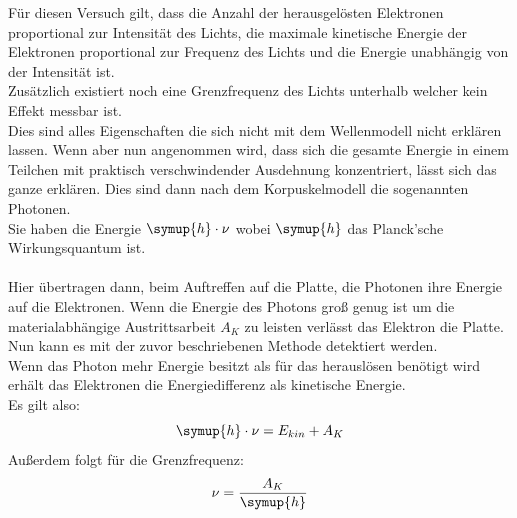     \noindent Für diesen Versuch gilt, dass die Anzahl der herausgelösten Elektronen proportional zur Intensität des Lichts, 
    die maximale kinetische Energie der Elektronen proportional zur Frequenz des Lichts und die Energie unabhängig von der Intensität ist.\\
    Zusätzlich existiert noch eine Grenzfrequenz des Lichts unterhalb welcher kein Effekt messbar ist.\\
    Dies sind alles Eigenschaften die sich nicht mit dem Wellenmodell nicht erklären lassen. Wenn aber nun angenommen wird, 
    dass sich die gesamte Energie in einem Teilchen mit praktisch verschwindender Ausdehnung konzentriert, lässt sich das ganze erklären.
    Dies sind dann nach dem Korpuskelmodell die sogenannten Photonen.\\
    Sie haben die Energie $\symup{h}\cdot \nu$ wobei $\symup{h}$ das Planck'sche Wirkungsquantum\cite{Planck} ist.\\\\
    \noindent Hier übertragen dann, beim Auftreffen auf die Platte, die Photonen ihre Energie auf die Elektronen.
    Wenn die Energie des Photons groß genug ist um die materialabhängige Austrittsarbeit $A_K$ zu leisten verlässt das Elektron die Platte.
    Nun kann es mit der zuvor beschriebenen Methode detektiert werden.\\
    Wenn das Photon mehr Energie besitzt als für das herauslösen benötigt wird erhält das Elektronen die Energiedifferenz als kinetische Energie.\\
    Es gilt also:
    \begin{equation*}
        \symup{h} \cdot \nu = E_{kin} + A_K
    \end{equation*}
    Außerdem folgt für die Grenzfrequenz:
    \begin{equation*}
        \nu=\frac{A_K}{\symup{h}}
    \end{equation*}
        
        



